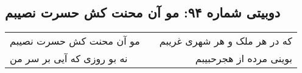 \begin{center}
\section*{دوبیتی شماره ۹۴: مو آن محنت کش حسرت نصیبم}
\label{sec:094}
\begin{longtable}{l p{0.5cm} r}
مو آن محنت کش حسرت نصیبم
&&
که در هر ملک و هر شهری غریبم
\\
نه بو روزی که آیی بر سر من
&&
بوینی مرده از هجرحبیبم
\\
\end{longtable}
\end{center}
